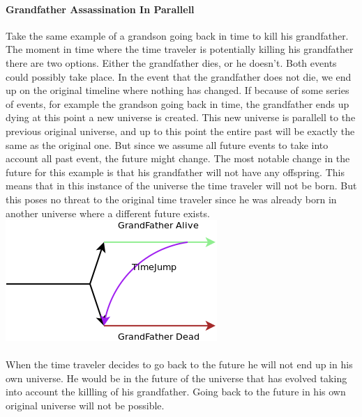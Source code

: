 \paragraph{Grandfather Assassination In Parallell}
Take the same example of a grandson going back in time to kill his grandfather. The moment in time where the time traveler is potentially killing his grandfather there are two options. Either the grandfather dies, or he doesn't. Both events could possibly take place. In the event that the grandfather does not die, we end up on the original timeline  where nothing has changed. If because of some series of events, for example the grandson going back in time, the grandfather ends up dying at this point a new universe is created. This new universe is parallell to the previous original universe, and up to this point the entire past will be exactly the same as the original one. But since we assume all future events to take into account all past event, the future might change. The most notable change in the future for this example is that his grandfather will not have any offspring. This means that in this instance of the universe the time traveler will not be born. But this poses no threat to the original time traveler since he was already born in another universe where a different future exists.
\\
\includegraphics[scale=0.5]{./images/parallell.png}
\paragraph{}
When the time traveler decides to go back to the future he will not end up in his own universe. He would be in the future of the universe that has evolved taking into account the killling of his grandfather. Going back to the future in his own original universe will not be possible.
